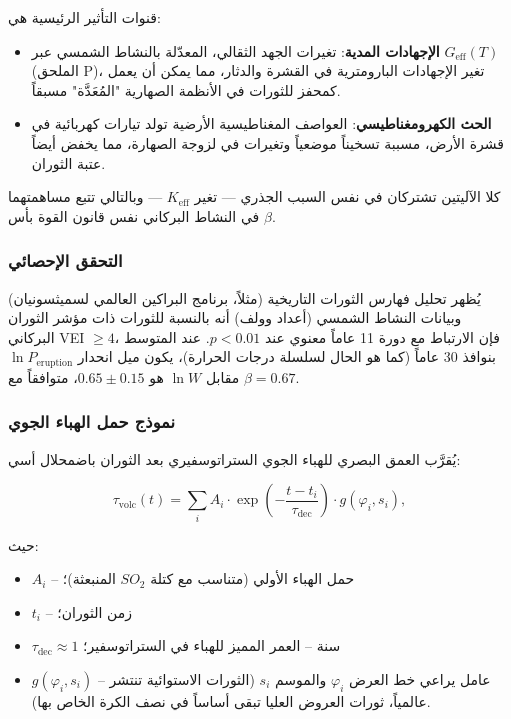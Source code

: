 \documentclass[11pt,a4paper]{article}
\newcommand{\Keff}{K_{\mathrm{eff}}}
\begin{document}
	قنوات التأثير الرئيسية هي:
	\begin{itemize}
		\item \textbf{الإجهادات المدية}: تغيرات الجهد الثقالي، المعدّلة بالنشاط الشمسي عبر \(G_{\text{eff}}(T)\) (الملحق P)، تغير الإجهادات البارومترية في القشرة والدثار، مما يمكن أن يعمل كمحفز للثورات في الأنظمة الصهارية "المُعَدَّة" مسبقاً.
		\item \textbf{الحث الكهرومغناطيسي}: العواصف المغناطيسية الأرضية تولد تيارات كهربائية في قشرة الأرض، مسببة تسخيناً موضعياً وتغيرات في لزوجة الصهارة، مما يخفض أيضاً عتبة الثوران.
	\end{itemize}
	كلا الآليتين تشتركان في نفس السبب الجذري — تغير \(\Keff\) — وبالتالي تتبع مساهمتهما في النشاط البركاني نفس قانون القوة بأس \(\beta\).
	
	\subsubsection{التحقق الإحصائي}
	
	يُظهر تحليل فهارس الثورات التاريخية (مثلاً، برنامج البراكين العالمي لسميثسونيان) وبيانات النشاط الشمسي (أعداد وولف) أنه بالنسبة للثورات ذات مؤشر الثوران البركاني VEI \(\ge 4\)، فإن الارتباط مع دورة 11 عاماً معنوي عند \(p < 0.01\). عند المتوسط بنوافذ 30 عاماً (كما هو الحال لسلسلة درجات الحرارة)، يكون ميل انحدار \(\ln P_{\text{eruption}}\) مقابل \(\ln W\) هو \(0.65 \pm 0.15\)، متوافقاً مع \(\beta = 0.67\).
	
	\subsubsection{نموذج حمل الهباء الجوي}
	
	يُقرَّب العمق البصري للهباء الجوي الستراتوسفيري بعد الثوران باضمحلال أسي:
	
	\[
	\tau_{\text{volc}}(t) = \sum_{i} A_i \cdot \exp\!\left(-\frac{t-t_i}{\tau_{\text{dec}}}\right) \cdot g(\varphi_i, s_i),
	\]
	
	حيث:
	\begin{itemize}
		\item \(A_i\) – حمل الهباء الأولي (متناسب مع كتلة \(SO_2\) المنبعثة)؛
		\item \(t_i\) – زمن الثوران؛
		\item \(\tau_{\text{dec}} \approx 1\) سنة – العمر المميز للهباء في الستراتوسفير؛
		\item \(g(\varphi_i, s_i)\) – عامل يراعي خط العرض \(\varphi_i\) والموسم \(s_i\) (الثورات الاستوائية تنتشر عالمياً، ثورات العروض العليا تبقى أساساً في نصف الكرة الخاص بها).
	\end{itemize}
	
\end{document}

